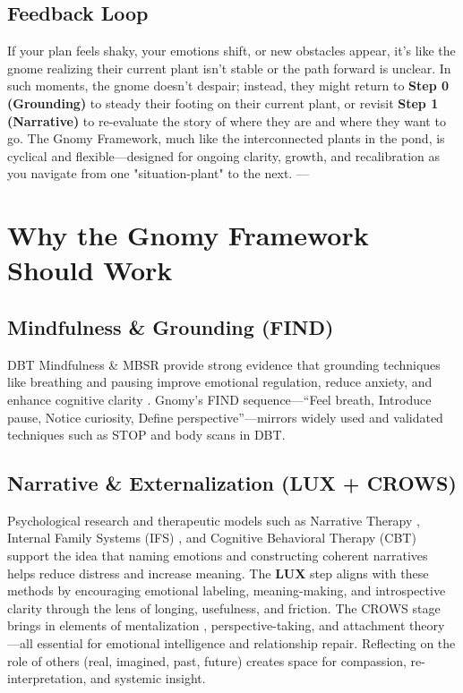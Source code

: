 \documentclass{article}
\begin{document}
\subsection{Feedback Loop}
If your plan feels shaky, your emotions shift, or new obstacles appear, it's like the gnome realizing their current plant isn't stable or the path forward is unclear. In such moments, the gnome doesn't despair; instead, they might return to \textbf{Step 0 (Grounding)} to steady their footing on their current plant, or revisit \textbf{Step 1 (Narrative)} to re-evaluate the story of where they are and where they want to go. The Gnomy Framework, much like the interconnected plants in the pond, is cyclical and flexible—designed for ongoing clarity, growth, and recalibration as you navigate from one "situation-plant" to the next.
---

\section{Why the Gnomy Framework Should Work}

\subsection{Mindfulness \& Grounding (FIND)}
DBT Mindfulness \& MBSR provide strong evidence that grounding techniques like breathing and pausing improve emotional regulation, reduce anxiety, and enhance cognitive clarity \cite{linehan1993cognitive, kabat1990full}. Gnomy's FIND sequence—``Feel breath, Introduce pause, Notice curiosity, Define perspective''—mirrors widely used and validated techniques such as STOP and body scans in DBT.

\subsection{Narrative \& Externalization (LUX + CROWS)}
Psychological research and therapeutic models such as Narrative Therapy \cite{white1990narrative}, Internal Family Systems (IFS) \cite{schwartz1995internal}, and Cognitive Behavioral Therapy (CBT) \cite{beck1979cognitive} support the idea that naming emotions and constructing coherent narratives helps reduce distress and increase meaning. The \textbf{LUX} step aligns with these methods by encouraging emotional labeling, meaning-making, and introspective clarity through the lens of longing, usefulness, and friction. The CROWS stage brings in elements of mentalization \cite{fonagy2002affect}, perspective-taking, and attachment theory \cite{bowlby1969attachment}—all essential for emotional intelligence and relationship repair. Reflecting on the role of others (real, imagined, past, future) creates space for compassion, re-interpretation, and systemic insight.
\end{document}
